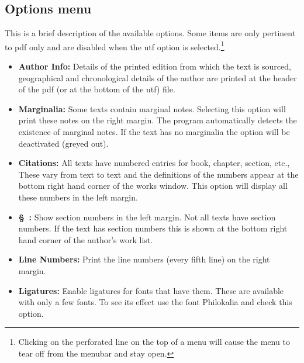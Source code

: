 \documentclass[11pt,a4paper]{article}
\begin{document}
  \subsection{Options menu}
    This is a brief description of the available options.
    Some items are only pertinent to pdf only and are disabled when the utf option
    is selected.\footnote{Clicking on the
    perforated line on the top of a menu will cause the menu to
    tear off from the menubar and stay open.}
    \begin{itemize}
    \item {\bf Author Info:} Details of the printed edition from which the text
         is sourced, geographical and chronological details of the author are
         printed at the header of the pdf (or at the bottom of the utf) file.
    \item {\bf Marginalia:} Some texts contain marginal notes. Selecting this option will
    print these notes on the right margin. The program automatically detects
    the existence of marginal notes. If the text has no marginalia the option
    will be deactivated (greyed out).
    \item {\bf Citations:} All texts have numbered entries for book, chapter, section, etc.,
    These vary from text to text and the definitions of the numbers appear at the bottom
    right hand corner of the works window. This option will display all these numbers
    in the left margin.
    \item {\bf \S\ :} Show section numbers in the left margin. Not all texts
    have section numbers. If the text has section numbers this is shown at the
    bottom right hand corner of the author's work list.
    \item {\bf Line Numbers:} Print the line numbers (every fifth line) on the right margin.
    \item {\bf Ligatures:} Enable ligatures for fonts that have them.  These are
    available with only a few fonts. To see its effect use the font Philokalia
    and check this option.
    \begin{figure}[htb]
      \begin{center}

\end{center}
\end{figure}
\end{itemize}
\end{document}
